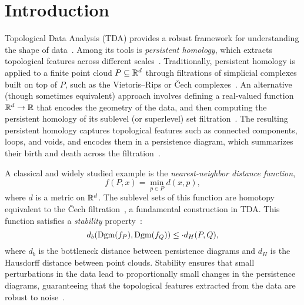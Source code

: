 \newcommand{\package}{\emph}

\chapter{Introduction}
\label{chap:introduction}

Topological Data Analysis (TDA) provides a robust framework for understanding
the shape of data~\cite{carlsson2021topological}. Among its tools is
\emph{persistent homology}, which extracts
topological features across different scales~\cite{boissonnat2018geometric}.
Traditionally, persistent homology is applied to a finite point cloud $P
\subseteq \mathbb{R}^d$ through filtrations of simplicial complexes built on top of $P$,
such as the Vietoris–Rips or \v{C}ech complexes~\cite{chazal2021introduction}.
An alternative (though sometimes equivalent) approach involves defining a
real-valued function $\mathbb{R}^d \to \mathbb{R}$ that encodes the geometry of the data, and
then computing the persistent homology of its sublevel (or superlevel) set
filtration~\cite{edelsbrunner2010computational}. The resulting persistent
homology captures topological features such as connected components, loops, and
voids, and encodes them in a persistence diagram, which summarizes their birth
and death across the filtration~\cite{chazal2021introduction}.

A classical and widely studied example is the \emph{nearest-neighbor distance
function},
\begin{equation}
    f(P, x) = \min_{p \in P} d(x, p),
\end{equation}
where $d$ is a metric on $\mathbb{R}^d$. The sublevel sets of this function are
homotopy equivalent to the \v{C}ech filtration~\cite{schnider2024introduction},
a fundamental construction in TDA.  This function satisfies a \emph{stability}
property~\cite{chazal2013persistencestabilitygeometriccomplexes}:
\begin{equation}
    d_b(\operatorname{Dgm}(f_P), \operatorname{Dgm}(f_Q)) \leq \cdot d_H(P, Q),
\end{equation}
where $d_b$ is the bottleneck distance between persistence diagrams and $d_H$ is
the Hausdorff distance between point clouds.
Stability ensures that small perturbations in the data lead to proportionally
small changes in the persistence diagrams, guaranteeing that the topological
features extracted from the data are robust to noise~\cite{chazal2021introduction}.

